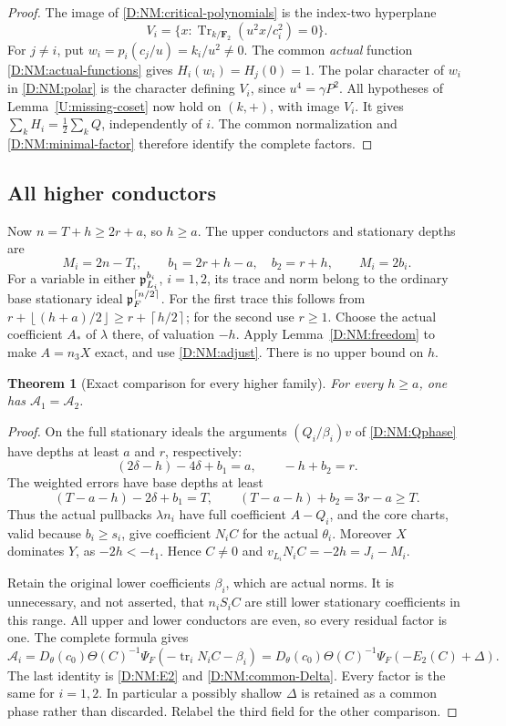 \documentclass[11pt]{amsart}
\newtheorem{theorem}{Theorem}[section]
\theoremstyle{definition}
\theoremstyle{remark}
\newcommand{\F}{\mathbf F}
\newcommand{\Tr}{\operatorname{Tr}}
\newcommand{\ceil}[1]{\left\lceil #1\right\rceil}
\newcommand{\floor}[1]{\left\lfloor #1\right\rfloor}
\begin{document}
\begin{proof}
The image of \eqref{D:NM:critical-polynomials} is the index-two hyperplane
\[
 V_i=\{x:\Tr_{k/\F_2}(u^2x/c_i^2)=0\}.
\]
For $j\ne i$, put $w_i=p_i(c_j/u)=k_i/u^2\ne0$.
The common \emph{actual} function \eqref{D:NM:actual-functions} gives
$H_i(w_i)=H_j(0)=1$. The polar character of $w_i$ in \eqref{D:NM:polar}
is the character defining $V_i$, since $u^4=\gamma P^2$.
All hypotheses of Lemma~\ref{U:missing-coset} now hold on $(k,+)$,
with image $V_i$. It gives $\sum_kH_i=\frac12\sum_kQ$, independently
of $i$. The common normalization and \eqref{D:NM:minimal-factor}
therefore identify the complete factors.
\end{proof}

\subsection{All higher conductors}
Now $n=T+h\ge2r+a$, so $h\ge a$. The upper conductors and stationary
depths are
\begin{equation}\label{D:NM:higher-depths}
 M_i=2n-T_i,\qquad b_1=2r+h-a,\quad b_2=r+h,
 \qquad M_i=2b_i.
\end{equation}
For a variable in either $\mathfrak p_{L_i}^{b_i}$, $i=1,2$, its trace and norm
belong to the ordinary base stationary ideal
$\pp_F^{\ceil{n/2}}$. For the first trace this follows from
$r+\floor{(h+a)/2}\ge r+\ceil{h/2}$; for the second use $r\ge1$.
Choose the actual coefficient $A_*$ of $\lambda$ there, of valuation
$-h$. Apply Lemma~\ref{D:NM:freedom} to make $A=n_3X$ exact, and use
\eqref{D:NM:adjust}. There is no upper bound on $h$.

\begin{theorem}[Exact comparison for every higher family]\label{D:NM:higher}
For every $h\ge a$, one has $\mathcal A_1=\mathcal A_2$.
\end{theorem}
\begin{proof}
On the full stationary ideals the arguments $(Q_i/\beta_i)v$ of
\eqref{D:NM:Qphase} have depths at least $a$ and $r$, respectively:
\[
 (2\delta-h)-4\delta+b_1=a,\qquad -h+b_2=r.
\]
The weighted errors have base depths at least
\[
 (T-a-h)-2\delta+b_1=T,\qquad (T-a-h)+b_2=3r-a\ge T.
\]
Thus the actual pullbacks $\lambda n_i$ have full coefficient $A-Q_i$,
and the core charts, valid because $b_i\ge s_i$, give coefficient $N_iC$
for the actual $\theta_i$. Moreover $X$ dominates $Y$, as
$-2h<-t_1$. Hence $C\ne0$ and $v_{L_i}N_iC=-2h=J_i-M_i$.

Retain the original lower coefficients $\beta_i$, which are actual norms.
It is unnecessary, and not asserted, that $n_iS_iC$ are still lower
stationary coefficients in this range. All upper and lower conductors
are even, so every residual factor is one. The complete formula gives
\[
 \mathcal A_i=D_\theta(c_0)\Theta(C)^{-1}
               \Psi_F(-\operatorname{tr}_i N_iC-\beta_i)
 =D_\theta(c_0)\Theta(C)^{-1}\Psi_F(-E_2(C)+\Delta).
\]
The last identity is \eqref{D:NM:E2} and \eqref{D:NM:common-Delta}.
Every factor is the same for $i=1,2$. In particular a possibly shallow
$\Delta$ is retained as a common phase rather than discarded.
Relabel the third field for the other comparison.
\end{proof}
\end{document}
